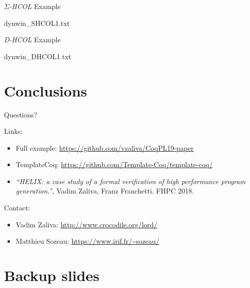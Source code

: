 \documentclass[aspectratio=169]{beamer}
\newcommand{\SHCOL}{\texorpdfstring{$\Sigma$-\emph{HCOL}}{Sigma-HCOL}}
\newcommand{\DHCOL}{\emph{D-HCOL}}
\begin{document}
\begin{frame}[fragile]{{\SHCOL} Example}
  \vspace{-2mm}
  
  {dynwin_SHCOL1.txt}
\end{frame}

\begin{frame}[fragile]{{\DHCOL} Example}
  \vspace{-2mm}
  
  {dynwin_DHCOL1.txt}
\end{frame}

\section{Conclusions}
  
\begin{frame}{Questions?}

  Links:
  
  \begin{itemize}
  \item Full example: \url{https://github.com/vzaliva/CoqPL19-paper}
  \item TemplateCoq:
    \url{https://github.com/Template-Coq/template-coq/}
  \item \textit{``HELIX: a case
    study of a formal verification of high performance program
    generation.''}, Vadim Zaliva, Franz Franchetti. FHPC 2018. 
  \end{itemize}

  Contact:

  \begin{itemize}
  \item Vadim Zaliva: \url{http://www.crocodile.org/lord/}
  \item Matthieu Sozeau: \url{https://www.irif.fr/~sozeau/}
  \end{itemize}  
  
\end{frame}

\section{Backup slides}
\end{document}
